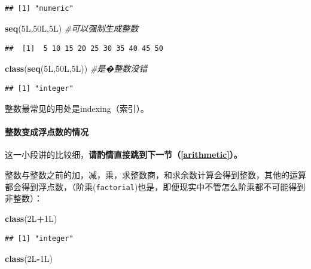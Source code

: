 \documentclass[]{book}
\newenvironment{Shaded}{\begin{snugshade}}{\end{snugshade}}
\newcommand{\CommentTok}[1]{\textcolor[rgb]{0.56,0.35,0.01}{\textit{#1}}}
\newcommand{\KeywordTok}[1]{\textcolor[rgb]{0.13,0.29,0.53}{\textbf{#1}}}
\newcommand{\NormalTok}[1]{#1}
\newcommand{\OperatorTok}[1]{\textcolor[rgb]{0.81,0.36,0.00}{\textbf{#1}}}
\let\oldparagraph\paragraph
\renewcommand{\paragraph}[1]{\oldparagraph{#1}\mbox{}}
\begin{document}
\begin{verbatim}
## [1] "numeric"
\end{verbatim}

\begin{Shaded}
\begin{Highlighting}[]
\KeywordTok{seq}\NormalTok{(5L,50L,5L) }\CommentTok{#可以强制生成整数}
\end{Highlighting}
\end{Shaded}

\begin{verbatim}
##  [1]  5 10 15 20 25 30 35 40 45 50
\end{verbatim}

\begin{Shaded}
\begin{Highlighting}[]
\KeywordTok{class}\NormalTok{(}\KeywordTok{seq}\NormalTok{(5L,50L,5L)) }\CommentTok{#是�整数没错}
\end{Highlighting}
\end{Shaded}

\begin{verbatim}
## [1] "integer"
\end{verbatim}

整数最常见的用处是indexing（索引）。

\paragraph{整数变成浮点数的情况}

这一小段讲的比较细，\textbf{请酌情直接跳到下一节（\ref{arithmetic}）。}

整数与整数之前的加，减，乘，求整数商，和求余数计算会得到整数，其他的运算都会得到浮点数，（阶乘(\texttt{factorial})也是，即便现实中不管怎么阶乘都不可能得到非整数）：

\begin{Shaded}
\begin{Highlighting}[]
\KeywordTok{class}\NormalTok{(2L}\OperatorTok{+}\NormalTok{1L)}
\end{Highlighting}
\end{Shaded}

\begin{verbatim}
## [1] "integer"
\end{verbatim}

\begin{Shaded}
\begin{Highlighting}[]
\KeywordTok{class}\NormalTok{(2L}\OperatorTok{-}\NormalTok{1L)}
\end{Highlighting}
\end{Shaded}
\end{document}
